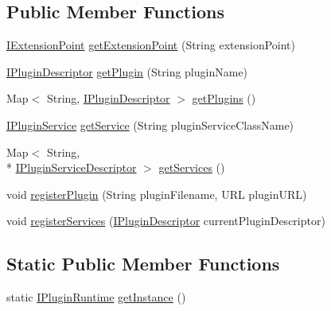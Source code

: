 \subsection*{Public Member Functions}
\begin{DoxyCompactItemize}
\item 
\hyperlink{interfaceorg_1_1tzi_1_1use_1_1main_1_1runtime_1_1_i_extension_point}{I\-Extension\-Point} \hyperlink{classorg_1_1tzi_1_1use_1_1runtime_1_1impl_1_1_plugin_runtime_a8f4fc856e7a9d753ac252a9216763385}{get\-Extension\-Point} (String extension\-Point)
\item 
\hyperlink{interfaceorg_1_1tzi_1_1use_1_1runtime_1_1_i_plugin_descriptor}{I\-Plugin\-Descriptor} \hyperlink{classorg_1_1tzi_1_1use_1_1runtime_1_1impl_1_1_plugin_runtime_ab89c597547f0723e1dbc0484e624eeac}{get\-Plugin} (String plugin\-Name)
\item 
Map$<$ String, \hyperlink{interfaceorg_1_1tzi_1_1use_1_1runtime_1_1_i_plugin_descriptor}{I\-Plugin\-Descriptor} $>$ \hyperlink{classorg_1_1tzi_1_1use_1_1runtime_1_1impl_1_1_plugin_runtime_a759f96ecdb756610643c1ccfd95cf16f}{get\-Plugins} ()
\item 
\hyperlink{interfaceorg_1_1tzi_1_1use_1_1runtime_1_1service_1_1_i_plugin_service}{I\-Plugin\-Service} \hyperlink{classorg_1_1tzi_1_1use_1_1runtime_1_1impl_1_1_plugin_runtime_a0df4e14950daee558758c7a9a948f24b}{get\-Service} (String plugin\-Service\-Class\-Name)
\item 
Map$<$ String, \\*
\hyperlink{interfaceorg_1_1tzi_1_1use_1_1runtime_1_1service_1_1_i_plugin_service_descriptor}{I\-Plugin\-Service\-Descriptor} $>$ \hyperlink{classorg_1_1tzi_1_1use_1_1runtime_1_1impl_1_1_plugin_runtime_acfa30113dbb9ff681d36fb8d6d493662}{get\-Services} ()
\item 
void \hyperlink{classorg_1_1tzi_1_1use_1_1runtime_1_1impl_1_1_plugin_runtime_aabd2731bfd68939db56a4cd72c934ee9}{register\-Plugin} (String plugin\-Filename, U\-R\-L plugin\-U\-R\-L)
\item 
void \hyperlink{classorg_1_1tzi_1_1use_1_1runtime_1_1impl_1_1_plugin_runtime_af89264de1cc99d06ff1ef8a6c1abe755}{register\-Services} (\hyperlink{interfaceorg_1_1tzi_1_1use_1_1runtime_1_1_i_plugin_descriptor}{I\-Plugin\-Descriptor} current\-Plugin\-Descriptor)
\end{DoxyCompactItemize}
\subsection*{Static Public Member Functions}
\begin{DoxyCompactItemize}
\item 
static \hyperlink{interfaceorg_1_1tzi_1_1use_1_1runtime_1_1_i_plugin_runtime}{I\-Plugin\-Runtime} \hyperlink{classorg_1_1tzi_1_1use_1_1runtime_1_1impl_1_1_plugin_runtime_a51c18e8e55cf431f183caf2af86ebb7b}{get\-Instance} ()
\end{DoxyCompactItemize}


